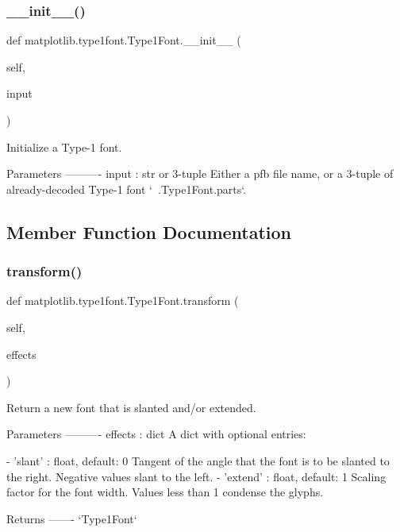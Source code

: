 \subsubsection{\texorpdfstring{\+\_\+\+\_\+init\+\_\+\+\_\+()}{\_\_init\_\_()}}
{\footnotesize\ttfamily def matplotlib.\+type1font.\+Type1\+Font.\+\_\+\+\_\+init\+\_\+\+\_\+ (\begin{DoxyParamCaption}\item[{}]{self,  }\item[{}]{input }\end{DoxyParamCaption})}

\begin{DoxyVerb}Initialize a Type-1 font.

Parameters
----------
input : str or 3-tuple
    Either a pfb file name, or a 3-tuple of already-decoded Type-1
    font `~.Type1Font.parts`.
\end{DoxyVerb}
 

\subsection{Member Function Documentation}
\mbox{\label{classmatplotlib_1_1type1font_1_1Type1Font_a1249e50d6995b114aeae9cdd4015457d}} 
\subsubsection{\texorpdfstring{transform()}{transform()}}
{\footnotesize\ttfamily def matplotlib.\+type1font.\+Type1\+Font.\+transform (\begin{DoxyParamCaption}\item[{}]{self,  }\item[{}]{effects }\end{DoxyParamCaption})}

\begin{DoxyVerb}Return a new font that is slanted and/or extended.

Parameters
----------
effects : dict
    A dict with optional entries:

    - 'slant' : float, default: 0
Tangent of the angle that the font is to be slanted to the
right. Negative values slant to the left.
    - 'extend' : float, default: 1
Scaling factor for the font width. Values less than 1 condense
the glyphs.

Returns
-------
`Type1Font`
\end{DoxyVerb}
 


